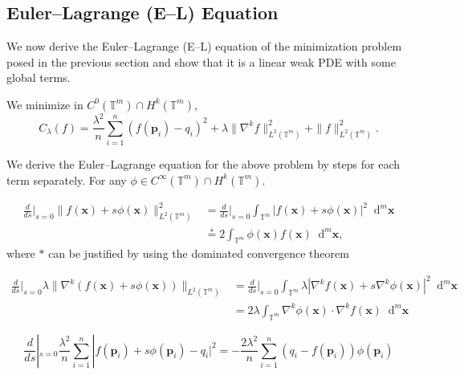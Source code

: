 \documentclass[multixcb]{amstext-l}
\theoremstyle{plain}
\theoremstyle{definition}
\theoremstyle{definition}
\theoremstyle{remark}
\numberwithin{equation}{chapter}
\begin{document}
\subsection{Euler--Lagrange (E--L) Equation }

We now derive the Euler--Lagrange (E--L) equation of the minimization problem posed in the previous section and show that it is a linear weak PDE with some global terms.


We minimize in $C^0(\mathbb{T}^m)\cap H^k(\mathbb{T}^m)$, \begin{equation}\label{eq8}C_{\lambda}(f) = \frac{\lambda^2}{n}\sum\limits_{i=1}^{n}(f(\boldsymbol{p}_i)-q_i)^2 + \lambda\|\nabla^kf\|_{L^2(\mathbb{T}^m)}^2 + \|f\|_{L^2(\mathbb{T}^m)}^2. \end{equation}

We derive the Euler--Lagrange equation for the above problem by steps for each term separately.
For any $\phi \in C^{\infty}(\mathbb{T}^m)\cap H^k(\mathbb{T}^m)$.

\begin{equation}\label{eq9}
\begin{aligned}
\frac{d}{ds}|_{s=0} \|f(\boldsymbol{x})+s\phi(\boldsymbol{x})\|_{L^2(\mathbb{T}^m)}^2 &= \frac{d}{ds}|_{s=0} \int_{\mathbb{T}^m} \left|f(\boldsymbol{x})+s\phi(\boldsymbol{x})\right|^{2} \mathop{}\!\mathrm{d}^m\boldsymbol{x}\\
&\stackrel{*}{=} 2\int_{\mathbb{T}^m} \phi(\boldsymbol{x}) f(\boldsymbol{x})\mathop{}\!\mathrm{d}^m\boldsymbol{x}, 
\end{aligned}
\end{equation} where $*$ can be justified by using the dominated convergence theorem

\begin{equation}\label{eq10}
\begin{aligned}
 \frac{d}{ds}|_{s=0} \lambda\| \nabla^k(f(\boldsymbol{x})+s\phi(\boldsymbol{x}))\|_{L^2(\mathbb{T}^m)} &= \frac{d}{ds}|_{s=0} \int_{\mathbb{T}^m} \lambda\left|\nabla^k f(\boldsymbol{x})+s \nabla^k \phi(\boldsymbol{x})\right|^2\mathop{}\!\mathrm{d}^m\boldsymbol{x}\\
&= 2\lambda\int_{\mathbb{T}^m} \nabla^k \phi(\boldsymbol{x}) \cdot \nabla^k f(\boldsymbol{x})\mathop{}\!\mathrm{d}^m\boldsymbol{x}
\end{aligned}
\end{equation}

\begin{equation}\label{eq11}\frac{d}{ds}|_{s=0} \frac{\lambda^2}{n}\sum\limits_{i = 1}^n|f(\boldsymbol{p}_i)+s\phi(\boldsymbol{p}_i)-q_i|^2 =  -\frac{2\lambda^2}{n}\sum\limits_{i = 1}^n (q_i-f(\boldsymbol{p}_i))\phi(\boldsymbol{p}_i)
\end{equation}
\end{document}
